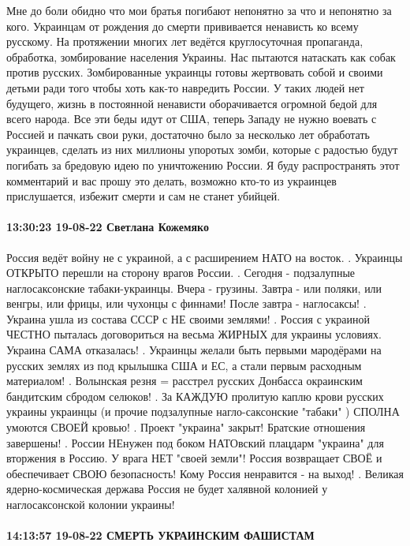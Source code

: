 Мне до боли обидно что мои братья погибают непонятно за что и непонятно за
кого. Украинцам от рождения до смерти прививается ненависть ко всему русскому.
На протяжении многих лет ведётся круглосуточная пропаганда, обработка,
зомбирование населения Украины. Нас пытаются натаскать как собак против
русских. Зомбированные украинцы готовы жертвовать собой и своими детьми ради
того чтобы хоть как-то навредить России. У таких людей нет будущего, жизнь в
постоянной ненависти оборачивается огромной бедой для всего народа. Все эти
беды идут от США, теперь Западу не нужно воевать с Россией и пачкать свои руки,
достаточно было за несколько лет обработать украинцев, сделать из них миллионы
упоротых зомби, которые с радостью будут погибать за бредовую идею по
уничтожению России. Я буду распространять этот комментарий и вас прошу это
делать, возможно кто-то из украинцев прислушается, избежит смерти и сам не
станет убийцей.

\paragraph{13:30:23 19-08-22 Светлана Кожемяко}

Россия ведёт войну не с украиной, а с расширением НАТО на восток.
.
Украинцы ОТКРЫТО перешли на сторону врагов России.
.
Сегодня - подзалупные наглосаксонские табаки-украинцы.
Вчера - грузины.
Завтра - или поляки, или венгры, или фрицы, или чухонцы с финнами!
После завтра - наглосаксы!
.
Украина ушла из состава СССР с НЕ своими землями!
.
Россия с украиной ЧЕСТНО пыталась договориться на весьма ЖИРНЫХ для украины условиях.
Украина САМА отказалась!
.
Украинцы желали быть первыми мародёрами на русских землях из под крылышка США и ЕС, а стали первым расходным материалом!
.
Волынская резня = расстрел русских Донбасса окраинским бандитским сбродом селюков!
.
За КАЖДУЮ пролитую каплю крови русских украины украинцы (и прочие подзалупные нагло-саксонские "табаки" ) СПОЛНА умоются СВОЕЙ кровью!
.
Проект "украина" закрыт!
Братские отношения завершены!
.
России НЕнужен под боком НАТОвский плацдарм "украина" для вторжения в Россию.
У врага НЕТ "своей земли"!
Россия возвращает СВОЁ и обеспечивает СВОЮ безопасность!
Кому Россия ненравится - на выход!
.
Великая ядерно-космическая держава Россия не будет халявной колонией у наглосаксонской колонии украины!

\paragraph{14:13:57 19-08-22 СМЕРТЬ УКРАИНСКИМ ФАШИСТАМ}

